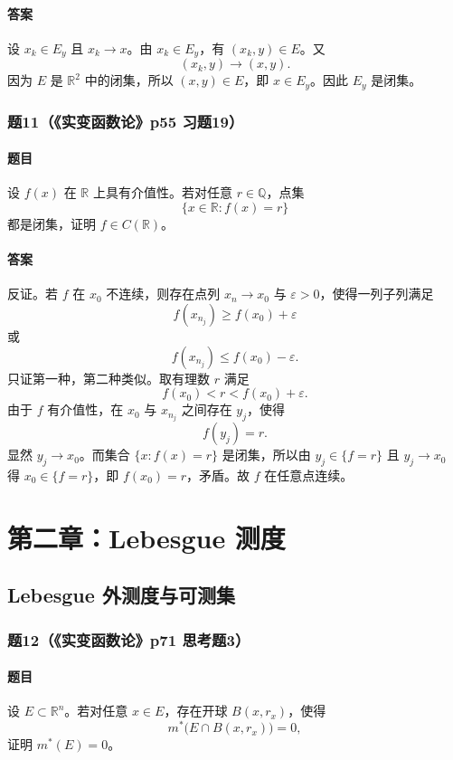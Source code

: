 \documentclass{article}
\newcommand{\R}{\mathbb{R}}
\newcommand{\Q}{\mathbb{Q}}
\newcommand{\eps}{\varepsilon}
\newcommand{\mouter}{m^*}
\begin{document}
\paragraph{答案}设 $x_k\in E_y$ 且 $x_k\to x$。由 $x_k\in E_y$，有 $(x_k,y)\in E$。又
\[
(x_k,y)\to(x,y).
\]
因为 $E$ 是 $\R^2$ 中的闭集，所以 $(x,y)\in E$，即 $x\in E_y$。因此 $E_y$ 是闭集。

\subsubsection*{题11（《实变函数论》p55 习题19）}
\paragraph{题目}设 $f(x)$ 在 $\R$ 上具有介值性。若对任意 $r\in\Q$，点集
\[
\{x\in\R:f(x)=r\}
\]
都是闭集，证明 $f\in C(\R)$。

\paragraph{答案}反证。若 $f$ 在 $x_0$ 不连续，则存在点列 $x_n\to x_0$ 与 $\eps>0$，使得一列子列满足
\[
f(x_{n_j})\ge f(x_0)+\eps
\]
或
\[
f(x_{n_j})\le f(x_0)-\eps.
\]
只证第一种，第二种类似。取有理数 $r$ 满足
\[
f(x_0)<r<f(x_0)+\eps.
\]
由于 $f$ 有介值性，在 $x_0$ 与 $x_{n_j}$ 之间存在 $y_j$，使得
\[
f(y_j)=r.
\]
显然 $y_j\to x_0$。而集合 $\{x:f(x)=r\}$ 是闭集，所以由 $y_j\in\{f=r\}$ 且 $y_j\to x_0$ 得 $x_0\in\{f=r\}$，即 $f(x_0)=r$，矛盾。故 $f$ 在任意点连续。

\section{第二章：Lebesgue 测度}

\subsection{Lebesgue 外测度与可测集}

\subsubsection*{题12（《实变函数论》p71 思考题3）}
\paragraph{题目}设 $E\subset\R^n$。若对任意 $x\in E$，存在开球 $B(x,r_x)$，使得
\[
\mouter\bigl(E\cap B(x,r_x)\bigr)=0,
\]
证明 $\mouter(E)=0$。
\end{document}
